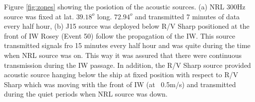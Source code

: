 %

Figure \ref{fig:zones} showing the posiotion of the acoustic sources. (a) NRL 300Hz source was fixed at lat. $39.18^o$ long. $72.94^o$ and transmitted 7 minutes of data every half hour, (b) J15 source was deployed below R/V Sharp positioned at the front of IW Rosey (Event 50) follow the propagation of the IW. This source transmitted signals fro 15 minutes every half hour and was quite during the time when NRL source was on. This way it was assured that there were continuous transmission during the IW passage. In addition, the R/V Sharp source provided acoustic source hanging below the ship at fixed position with respect to R/V Sharp which was moving with the front of IW (at ~0.5m/s) and transmitted during the quiet periods when NRL source was down.

